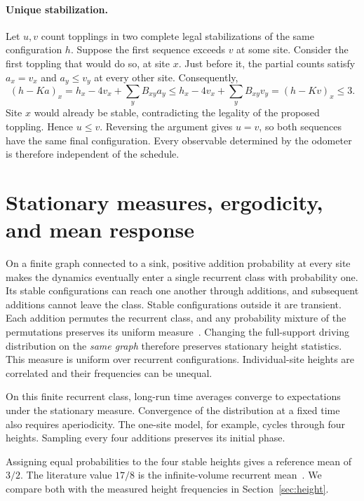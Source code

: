 \paragraph{Unique stabilization.}
Let $u,v$ count topplings in two complete legal stabilizations of the same configuration $h$. Suppose the first sequence exceeds $v$ at some site. Consider the first toppling that would do so, at site $x$. Just before it, the partial counts satisfy $a_x=v_x$ and $a_y\leq v_y$ at every other site. Consequently,
\begin{equation}
 (h-Ka)_x=h_x-4v_x+\sum_y B_{xy}a_y
 \leq h_x-4v_x+\sum_y B_{xy}v_y=(h-Kv)_x\leq3.
\end{equation}
Site $x$ would already be stable, contradicting the legality of the proposed toppling. Hence $u\leq v$. Reversing the argument gives $u=v$, so both sequences have the same final configuration. Every observable determined by the odometer is therefore independent of the schedule.

\section{Stationary measures, ergodicity, and mean response}\label{sec:recurrence}
On a finite graph connected to a sink, positive addition probability at every site makes the dynamics eventually enter a single recurrent class with probability one. Its stable configurations can reach one another through additions, and subsequent additions cannot leave the class. Stable configurations outside it are transient. Each addition permutes the recurrent class, and any probability mixture of the permutations preserves its uniform measure~\cite[Theorems 2.9, 2.11 and Exercise 2.16]{jarai2018}. Changing the full-support driving distribution on the \emph{same graph} therefore preserves stationary height statistics. This measure is uniform over recurrent configurations. Individual-site heights are correlated and their frequencies can be unequal.

On this finite recurrent class, long-run time averages converge to expectations under the stationary measure. Convergence of the distribution at a fixed time also requires aperiodicity. The one-site model, for example, cycles through four heights. Sampling every four additions preserves its initial phase.

Assigning equal probabilities to the four stable heights gives a reference mean of $3/2$. The literature value $17/8$ is the infinite-volume recurrent mean~\cite{levine2014}. We compare both with the measured height frequencies in Section~\ref{sec:height}.


